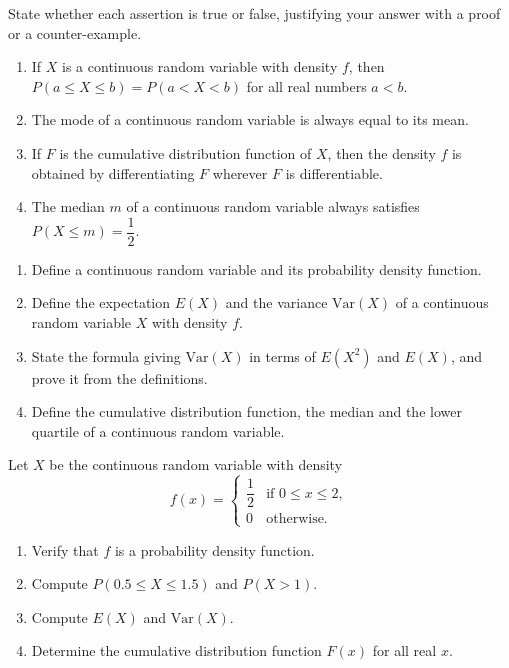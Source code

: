 \documentclass[11pt]{article}
\newcommand{\cle}[1]{{\popxbold\color{popdark}#1}}
\begin{document}
\begin{exercice}
State whether each assertion is true or false, justifying your answer with a proof or a counter-example.
\begin{enumerate}
\item If $X$ is a continuous random variable with density $f$, then $P(a\leq X\leq b)=P(a<X<b)$ for all real numbers $a<b$.
\item The mode of a continuous random variable is always equal to its mean.
\item If $F$ is the cumulative distribution function of $X$, then the density $f$ is obtained by differentiating $F$ wherever $F$ is differentiable.
\item The median $m$ of a continuous random variable always satisfies $P(X\leq m)=\dfrac{1}{2}$.
\end{enumerate}
\end{exercice}

\begin{exercice}
\begin{enumerate}
\item Define a \cle{continuous random variable} and its \cle{probability density function}.
\item Define the \cle{expectation} $E(X)$ and the \cle{variance} $\mathrm{Var}(X)$ of a continuous random variable $X$ with density $f$.
\item State the formula giving $\mathrm{Var}(X)$ in terms of $E(X^2)$ and $E(X)$, and prove it from the definitions.
\item Define the \cle{cumulative distribution function}, the \cle{median} and the \cle{lower quartile} of a continuous random variable.
\end{enumerate}
\end{exercice}

\begin{exercice}
Let $X$ be the continuous random variable with density
\[
f(x)=\begin{cases} \dfrac{1}{2} & \text{if } 0\leq x\leq 2,\\ 0 & \text{otherwise.}\end{cases}
\]
\begin{enumerate}
\item Verify that $f$ is a probability density function.
\item Compute $P(0.5\leq X\leq 1.5)$ and $P(X>1)$.
\item Compute $E(X)$ and $\mathrm{Var}(X)$.
\item Determine the cumulative distribution function $F(x)$ for all real $x$.
\end{enumerate}
\end{exercice}
\end{document}
